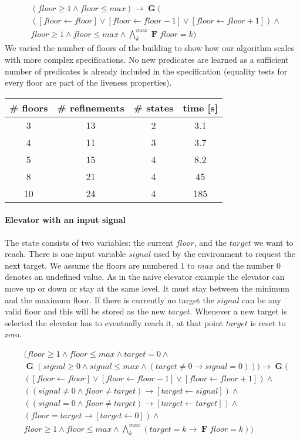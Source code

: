 \documentclass[runningheads]{llncs}
\newcommand{\eventually}{\operatorname{\mathbf{F}}}
\newcommand{\globally}{\operatorname{\mathbf{G}}}
\newcommand{\rarrow}{\boldsymbol{\rightarrow}}
\begin{document}
\begin{align*}
&(floor \geq 1 \land floor \leq max) \rarrow \globally (\\
&([floor \leftarrow floor] \lor [floor \leftarrow floor - 1] \lor [floor \leftarrow floor + 1]) \land \\
&floor \geq 1 \land floor \leq max \land \bigwedge_k^{max} \eventually floor = k)
\end{align*}
We varied the number of floors of the building to show how our algorithm scales with more complex specifications.
No new predicates are learned as a sufficient number of predicates is already included in the specification (equality tests for every floor are part of the liveness properties).
\begin{center}
\begin{tabular}{ |c|c|c|c| } 
\hline
\# floors & \# refinements & \# states & time [s]\\
\hline
3  & 13 & 2 & 3.1 \\
4  & 11 & 3 & 3.7 \\ 
5  & 15 & 4 & 8.2 \\ 
8  & 21 & 4 & 45 \\ 
10 & 24 & 4 & 185 \\ 
\hline
\end{tabular}
\end{center}

\paragraph{Elevator with an input signal}
The state consists of two variables: the current $floor$, and the $target$ we want to reach.
There is one input variable $signal$ used by the environment to request the next target.
We assume the floors are numbered $1$ to $max$ and the number $0$ denotes an undefined value.
As in the naive elevator example the elevator can move up or down or stay at the same level. 
It must stay between the minimum and the maximum floor.
If there is currently no target the $signal$ can be any valid floor and this will be stored as the new $target$.
Whenever a new target is selected the elevator has to eventually reach it, at that point $target$ is reset to zero.

\begin{align*}
&(floor \geq 1 \land floor \leq max \land target = 0 \land\\
&\globally (signal \geq 0 \land signal \leq max \land (target \neq 0 \rightarrow signal = 0))) \rarrow \globally (\\
&([floor \leftarrow floor] \lor [floor \leftarrow floor - 1] \lor [floor \leftarrow floor + 1]) \land \\
&((signal \neq 0 \land floor \neq target) \rightarrow [target \leftarrow signal]) \land\\
&((signal = 0 \land floor \neq target) \rightarrow [target \leftarrow target]) \land\\
&(floor = target \rightarrow [target \leftarrow 0]) \land\\
&floor \geq 1 \land floor \leq max \land \bigwedge_k^{max} (target=k \rightarrow \eventually floor = k))
\end{align*}
\end{document}
